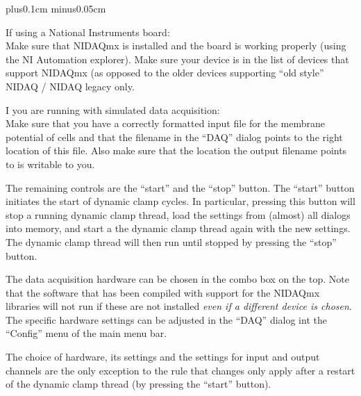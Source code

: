 \documentclass{article}
\makeatletter
\newenvironment{myenum}{
\begin{list}{\labelenumi}{\setlength{\leftmargin}{1.3em}
  \setcounter{enumi}{0}
  \renewcommand{\item}{\addtocounter{enumi}{1}\unskip \vspace{-0.1cm}\@inmatherr\item
  \@ifnextchar [\@item{\@noitemargtrue \@item[\@itemlabel]} \unskip}}
  \itemsep0.1cm plus0.1cm minus0.05cm
  \listparindent0cm
  \setlength{\labelsep}{0.5em}
  \setlength{\labelwidth}{0.8em}}
{\end{list}}
\makeatother
\begin{document}
\begin{myenum}
\addtocounter{enumi}{1}
\item If using a National Instruments board: \\
Make sure that NIDAQmx is installed and the board is working properly
(using the NI Automation explorer). Make sure your device is in the
list of devices that support NIDAQmx (as opposed to the older devices
supporting ``old style'' NIDAQ / NIDAQ legacy only.
\item I you are running with simulated data acquisition: \\
Make sure that you have a correctly formatted input file for the
membrane potential of cells and that the filename in the ``DAQ''
dialog points to the right location of this file. Also make sure that the
location the output filename points to is writable to you.
\end{myenum}

The remaining controls are the ``start'' and the ``stop'' button.  The
``start'' button initiates the start of dynamic clamp cycles. In
particular, pressing this button will stop a running dynamic clamp
thread, load the settings from (almost) all dialogs into memory, and
start a the dynamic clamp thread again with the new settings. The
dynamic clamp thread will then run until stopped by pressing the
``stop'' button.

The data acquisition hardware can be chosen in the combo box on the
top. Note that the software that has been compiled with support for
the NIDAQmx libraries will not run if these are not installed {\em
  even if a different device is chosen}. The specific hardware
settings can be adjusted in the ``DAQ'' dialog int the ``Config''
menu of the main menu bar.

The choice of hardware, its settings and the settings for input and
output channels are the only exception to the rule that changes only
apply after a restart of the dynamic clamp thread (by pressing the ``start''
button).
\end{document}
